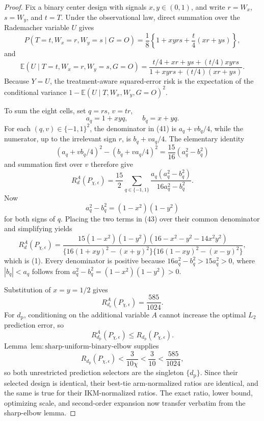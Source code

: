 \documentclass{article}
\begin{document}
\begin{proof}
Fix a binary center design with signals \(x,y\in(0,1)\), and write \(r=W_x\), \(s=W_y\), and \(t=T\).  Under the observational law, direct summation over the Rademacher variable \(U\) gives
\[
 P(T=t,W_x=r,W_y=s\mid G=O)
 =\frac18\left\{1+xyrs+\frac t4(xr+ys)\right\},           \tag{40}
\]
and
\[
 \mathbb E(U\mid T=t,W_x=r,W_y=s,G=O)
 =\frac{t/4+xr+ys+(t/4)xyrs}
 {1+xyrs+(t/4)(xr+ys)}.                                   \tag{41}
\]
Because \(Y=U\), the treatment-aware squared-error risk is the expectation of the conditional variance \(1-\mathbb E(U\mid T,W_x,W_y,G=O)^2\).

To sum the eight cells, set \(q=rs\), \(v=tr\),
\[
 a_q=1+xyq,
 \qquad b_q=x+yq.
\]
For each \((q,v)\in\{-1,1\}^2\), the denominator in (41) is \(a_q+vb_q/4\), while the numerator, up to the irrelevant sign \(r\), is \(b_q+va_q/4\).  The elementary identity
\[
 (a_q+vb_q/4)^2-(b_q+va_q/4)^2
 =\frac{15}{16}(a_q^2-b_q^2)                              \tag{42}
\]
and summation first over \(v\) therefore give
\[
 R_d^A(P_{\chi,\epsilon})
 =\frac{15}{2}\sum_{q\in\{-1,1\}}
 \frac{a_q(a_q^2-b_q^2)}{16a_q^2-b_q^2}.                 \tag{43}
\]
Now
\[
 a_q^2-b_q^2=(1-x^2)(1-y^2)
\]
for both signs of \(q\).  Placing the two terms in (43) over their common denominator and simplifying yields
\[
 R_d^A(P_{\chi,\epsilon})
 =\frac{15(1-x^2)(1-y^2)(16-x^2-y^2-14x^2y^2)}
 {\{16(1+xy)^2-(x+y)^2\}\{16(1-xy)^2-(x-y)^2\}},
\]
which is (1).  Every denominator is positive because \(16a_q^2-b_q^2>15a_q^2>0\), where \(|b_q|<a_q\) follows from \(a_q^2-b_q^2=(1-x^2)(1-y^2)>0\).

Substitution of \(x=y=1/2\) gives
\[
 R_{d_{\mathrm e}}^A(P_{\chi,\epsilon})=\frac{585}{1024}.
\]
For \(d_{\mathrm p}\), conditioning on the additional variable \(A\) cannot increase the optimal \(L_2\) prediction error, so
\[
 R_{d_{\mathrm p}}^A(P_{\chi,\epsilon})
 \le R_{d_{\mathrm p}}(P_{\chi,\epsilon}).
\]
Lemma~\(\mathrm{lem{:}sharp\text{-}uniform\text{-}binary\text{-}elbow}\) supplies
\[
 R_{d_{\mathrm p}}(P_{\chi,\epsilon})
 <\frac3{10\chi}<\frac3{10}<\frac{585}{1024},
\]
so both unrestricted prediction selectors are the singleton \(\{d_{\mathrm p}\}\).  Since their selected design is identical, their best-tie arm-normalized ratios are identical, and the same is true for their IKM-normalized ratios.  The exact ratio, lower bound, optimizing scale, and second-order expansion now transfer verbatim from the sharp-elbow lemma.
\end{proof}
\end{document}
